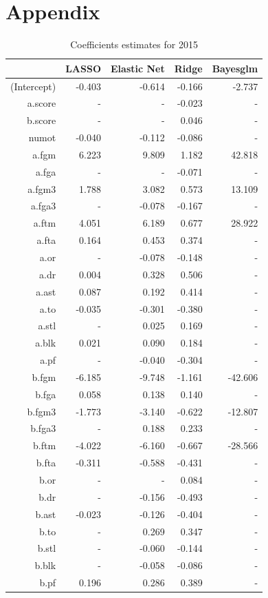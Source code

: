 \documentclass{article} %
\begin{document}
\section{Appendix}
\begin{table}[H]
\centering
{\small
\begin{tabular}{rrrrr}
  \hline
 & LASSO & Elastic Net & Ridge & Bayesglm \\ 
  \hline
(Intercept) & -0.403 & -0.614 & -0.166 & -2.737 \\ 
  a.score & - & - & -0.023 & - \\ 
  b.score & - & - & 0.046 & - \\ 
  numot & -0.040 & -0.112 & -0.086 & - \\ 
  a.fgm & 6.223 & 9.809 & 1.182 & 42.818 \\ 
  a.fga & - & - & -0.071 & - \\ 
  a.fgm3 & 1.788 & 3.082 & 0.573 & 13.109 \\ 
  a.fga3 & - & -0.078 & -0.167 & - \\ 
  a.ftm & 4.051 & 6.189 & 0.677 & 28.922 \\ 
  a.fta & 0.164 & 0.453 & 0.374 & - \\ 
  a.or & - & -0.078 & -0.148 & - \\ 
  a.dr & 0.004 & 0.328 & 0.506 & - \\ 
  a.ast & 0.087 & 0.192 & 0.414 & - \\ 
  a.to & -0.035 & -0.301 & -0.380 & - \\ 
  a.stl & - & 0.025 & 0.169 & - \\ 
  a.blk & 0.021 & 0.090 & 0.184 & - \\ 
  a.pf & - & -0.040 & -0.304 & - \\ 
  b.fgm & -6.185 & -9.748 & -1.161 & -42.606 \\ 
  b.fga & 0.058 & 0.138 & 0.140 & - \\ 
  b.fgm3 & -1.773 & -3.140 & -0.622 & -12.807 \\ 
  b.fga3 & - & 0.188 & 0.233 & - \\ 
  b.ftm & -4.022 & -6.160 & -0.667 & -28.566 \\ 
  b.fta & -0.311 & -0.588 & -0.431 & - \\ 
  b.or & - & - & 0.084 & - \\ 
  b.dr & - & -0.156 & -0.493 & - \\ 
  b.ast & -0.023 & -0.126 & -0.404 & - \\ 
  b.to & - & 0.269 & 0.347 & - \\ 
  b.stl & - & -0.060 & -0.144 & - \\ 
  b.blk & - & -0.058 & -0.086 & - \\ 
  b.pf & 0.196 & 0.286 & 0.389 & - \\ 
   \hline
\end{tabular}
}
\caption{Coefficients estimates for 2015}\
\end{table}
\end{document}
